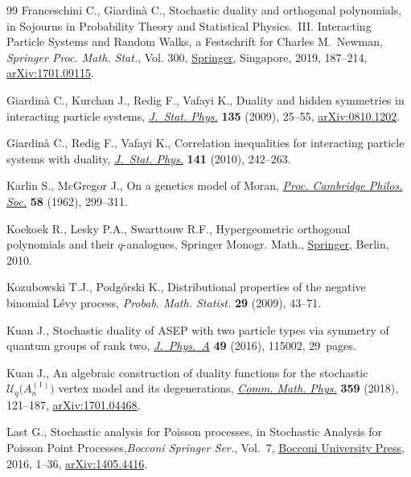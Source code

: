 \documentclass[pdftex]{sigma}
\numberwithin{equation}{section}
\newcommand{\1}{\mathbbm{1}}
\begin{document}
\begin{thebibliography}{99}
Franceschini C., Giardin\`a C., Stochastic duality and orthogonal polynomials,
 in Sojourns in Probability Theory and Statistical Physics.~{III}.
 {I}nteracting Particle Systems and Random Walks, a {F}estschrift for
 {C}harles {M}.~{N}ewman, \textit{Springer Proc. Math. Stat.}, Vol. 300,
 \href{https://doi.org/10.1007/978-981-15-0302-3_7}{Springer}, Singapore, 2019, 187--214, \href{https://arxiv.org/abs/1701.09115}{arXiv:1701.09115}.

Giardin\`a C., Kurchan J., Redig F., Vafayi K., Duality and hidden symmetries
 in interacting particle systems, \href{https://doi.org/10.1007/s10955-009-9716-2}{\textit{J.~Stat. Phys.}} \textbf{135} (2009),
 25--55, \href{https://arxiv.org/abs/0810.1202}{arXiv:0810.1202}.

Giardin\`a C., Redig F., Vafayi K., Correlation inequalities for interacting
 particle systems with duality, \href{https://doi.org/10.1007/s10955-010-0055-0}{\textit{J.~Stat. Phys.}} \textbf{141} (2010),
 242--263.

Karlin S., McGregor J., On a genetics model of {M}oran, \href{https://doi.org/10.1017/S0305004100036513}{\textit{Proc. Cambridge
 Philos. Soc.}} \textbf{58} (1962), 299--311.

Koekoek R., Lesky P.A., Swarttouw R.F., Hypergeometric orthogonal polynomials
 and their {$q$}-analogues, Springer Monogr. Math., \href{https://doi.org/10.1007/978-3-642-05014-5}{Springer}, Berlin, 2010.

Kozubowski T.J., Podg\'orski K., Distributional properties of the negative
 binomial {L}\'evy process, \textit{Probab. Math. Statist.} \textbf{29}
 (2009), 43--71.

Kuan J., Stochastic duality of {ASEP} with two particle types via symmetry of
 quantum groups of rank two, \href{https://doi.org/10.1088/1751-8113/49/11/115002}{\textit{J.~Phys.~A}} \textbf{49} (2016), 115002,
 29~pages.

Kuan J., An algebraic construction of duality functions for the stochastic
 {$\mathcal{U}_q\bigl( A_n^{(1)}\bigr)$} vertex model and its degenerations,
 \href{https://doi.org/10.1007/s00220-018-3108-x}{\textit{Comm. Math. Phys.}} \textbf{359} (2018), 121--187,
 \href{https://arxiv.org/abs/1701.04468}{arXiv:1701.04468}.

Last G., Stochastic analysis for {P}oisson processes, in Stochastic Analysis
 for {P}oisson Point Processes,\textit{Bocconi Springer Ser.}, Vol.~7,
 \href{https://doi.org/10.1007/978-3-319-05233-5_1}{Bocconi University Press}, 2016, 1--36, \href{https://arxiv.org/abs/1405.4416}{arXiv:1405.4416}.


\end{thebibliography}
\end{document}
